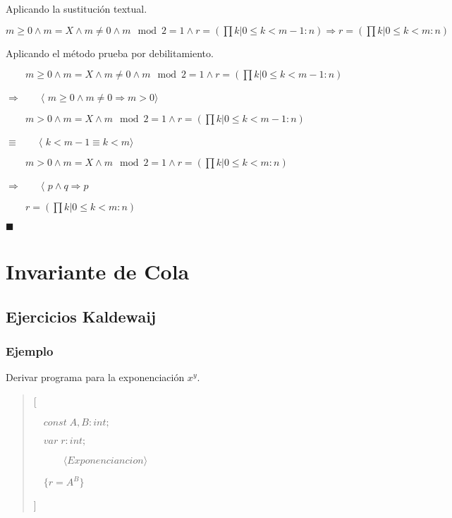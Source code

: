 \documentclass[hidelinks]{article}
\newenvironment{absolutelynopagebreak}
{\Needspace{10\baselineskip}\begin{quote}}
		{\end{quote}}
\begin{document}
Aplicando la sustitución textual.\par

$m \geq 0 \land m = X \land m \neq 0 \land m \mod 2 = 1 \land r = (\prod k | 0 \leq k < m - 1: n) \Rightarrow r = (\prod k | 0 \leq k < m: n)$\par

Aplicando el método prueba por debilitamiento.\par

$\qquad m \geq 0 \land m = X \land m \neq 0 \land m \mod 2 = 1 \land r = (\prod k | 0 \leq k < m - 1: n)$\par
$\Rightarrow \qquad \langle$ $ m \geq 0 \land m \neq 0 \Rightarrow m > 0\rangle$\par
$\qquad m > 0 \land m = X \land m \mod 2 = 1 \land r = (\prod k | 0 \leq k < m - 1: n)$\par
$\equiv \qquad \langle$ $ k < m - 1 \equiv k < m \rangle$\par
$\qquad m > 0 \land m = X \land m \mod 2 = 1 \land r = (\prod k | 0 \leq k < m: n)$\par
$\Rightarrow \qquad \langle$ $ p \land q \Rightarrow p$\par
$\qquad r = (\prod k | 0 \leq k < m: n)$\par
$\blacksquare$\par

\newpage
\section{Invariante de Cola}

\subsection{Ejercicios Kaldewaij}\par

\subsubsection{Ejemplo}

Derivar programa para la exponenciación $x^y$.\par

\begin{absolutelynopagebreak}
	[\par
		$\quad const \; A, B: int;$\par
		$\quad var \; r : int;$\par
		$\qquad \quad \langle Exponenciancion \rangle$ \par
		$\quad \{r =A^B\}$ \par
	]\par
\end{absolutelynopagebreak}\par
\end{document}
